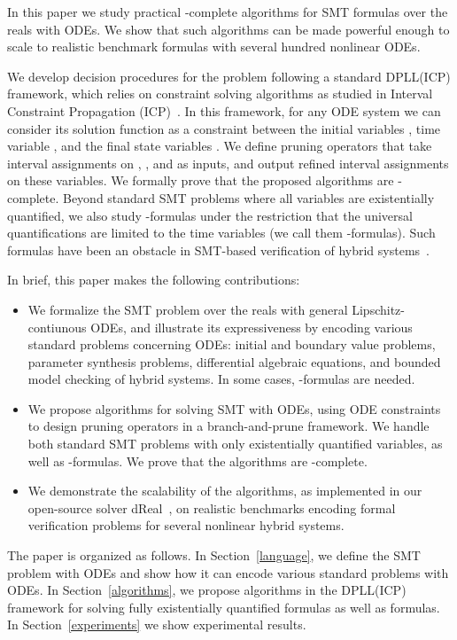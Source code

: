 \documentclass[12pt]{article}
\begin{document}
In this paper we study practical -complete algorithms for SMT formulas over the reals with ODEs. We show that such algorithms can be made powerful enough to scale to realistic benchmark formulas with several hundred nonlinear ODEs.

We develop decision procedures for the problem following a standard DPLL(ICP) framework, which relies on constraint solving algorithms as studied in Interval Constraint Propagation (ICP)~\cite{handbookICP}. In this framework, for any ODE system we can consider its solution function  as a constraint between the initial variables , time variable , and the final state variables . We define pruning operators that take interval assignments on , , and  as inputs, and output refined interval assignments on these variables. We formally prove that the proposed algorithms are -complete. Beyond standard SMT problems where all variables are existentially quantified, we also study -formulas under the restriction that the universal quantifications are limited to the time variables (we call them -formulas). Such formulas have been an obstacle in SMT-based verification of hybrid systems~\cite{DBLP:conf/fmcad/CimattiMT12,DBLP:conf/aaai/CimattiMT12}. 

In brief, this paper makes the following contributions:

\begin{itemize}
\item We formalize the SMT problem over the reals with general Lipschitz-contiunous ODEs, and illustrate its expressiveness by encoding various standard problems concerning ODEs: initial and boundary value problems, parameter synthesis problems, differential algebraic equations, and bounded model checking of hybrid systems. In some cases, -formulas are needed.
\item We propose algorithms for solving SMT with ODEs, using ODE constraints to design pruning operators in a branch-and-prune framework. We handle both standard SMT problems with only existentially quantified variables, as well as -formulas. We prove that the algorithms are -complete.
\item We demonstrate the scalability of the algorithms, as implemented in our open-source solver {\sf dReal}~\cite{DBLP:conf/cade/GaoKC13}, on realistic benchmarks encoding formal verification problems for several nonlinear hybrid systems.
\end{itemize}

The paper is organized as follows. In Section~\ref{language}, we define the SMT problem with ODEs and show how it can encode various standard problems with ODEs. In Section~\ref{algorithms}, we propose algorithms in the DPLL(ICP) framework for solving fully existentially quantified formulas as well as  formulas. In Section~\ref{experiments} we show experimental results.
\end{document}
